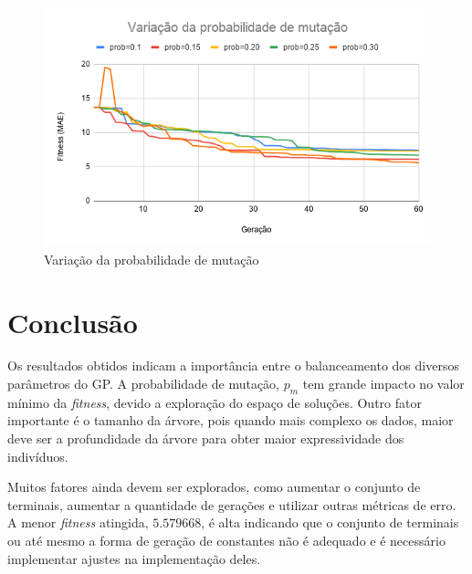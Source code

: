 \documentclass[a4paper]{paper}
\begin{document}
\begin{figure}[h!]
  \begin{minipage}{0.5\textwidth}
    \includegraphics[width=\textwidth]{var_pm}
    \caption{Variação da probabilidade de mutação}
    \label{fig:var_pm}
  \end{minipage}
\end{figure}
\newpage
\section{Conclusão}
Os resultados obtidos indicam a importância entre o balanceamento dos diversos
parâmetros do GP. A probabilidade de mutação, $p_m$ tem grande impacto no valor
mínimo da \textit{fitness}, devido a exploração do espaço de soluções. Outro
fator importante é o tamanho da árvore, pois quando mais complexo os dados,
maior deve ser a profundidade da árvore para obter maior expressividade dos
indivíduos.

Muitos fatores ainda devem ser explorados, como aumentar o conjunto de
terminais, aumentar a quantidade de gerações e utilizar outras métricas de erro.
A menor \textit{fitness} atingida, $5.579668$, é alta indicando que o conjunto
de terminais ou até mesmo a forma de geração de constantes não é adequado e
é necessário implementar ajustes na implementação deles.

\newpage


\end{document}

